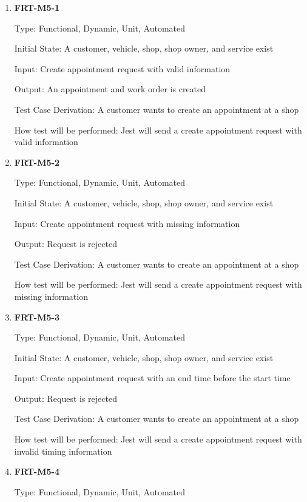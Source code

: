 \documentclass[12pt, titlepage]{article}
\begin{document}
\begin{enumerate}

	\item \textbf{FRT-M5-1}

	      Type: Functional, Dynamic, Unit, Automated

	      Initial State: A customer, vehicle, shop, shop owner, and service exist

	      Input: Create appointment request with valid information

	      Output: An appointment and work order is created

	      Test Case Derivation: A customer wants to create an appointment at a shop

	      How test will be performed: Jest will send a create appointment request with valid information

	\item \textbf{FRT-M5-2}

	      Type: Functional, Dynamic, Unit, Automated

	      Initial State: A customer, vehicle, shop, shop owner, and service exist

	      Input: Create appointment request with missing information

	      Output: Request is rejected

	      Test Case Derivation: A customer wants to create an appointment at a shop

	      How test will be performed: Jest will send a create appointment request with missing information

	\item \textbf{FRT-M5-3}

	      Type: Functional, Dynamic, Unit, Automated

	      Initial State: A customer, vehicle, shop, shop owner, and service exist

	      Input: Create appointment request with an end time before the start time

	      Output: Request is rejected

	      Test Case Derivation: A customer wants to create an appointment at a shop

	      How test will be performed: Jest will send a create appointment request with invalid timing
	      information

	\item \textbf{FRT-M5-4}

	      Type: Functional, Dynamic, Unit, Automated


\end{enumerate}
\end{document}

